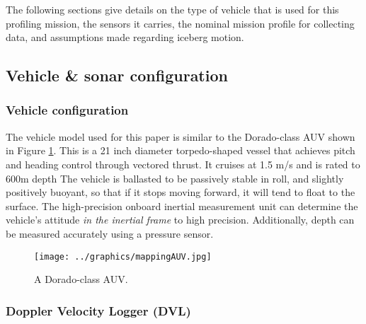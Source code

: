 The following sections give details on the type of vehicle that is used for this profiling mission, the sensors it carries, the nominal mission profile for collecting data, and assumptions made regarding iceberg motion. 

\subsection{Vehicle \& sonar configuration}
\label{sec.VehicleSetup}

\subsubsection{Vehicle configuration}
The vehicle model used for this paper is similar to the Dorado-class AUV shown in Figure \ref{fig:AUVdorado}. This is a 21 inch diameter torpedo-shaped vessel that achieves pitch and heading control through vectored thrust. It cruises at 1.5 m/s and is rated to 600m depth The vehicle is ballasted to be passively stable in roll, and slightly positively buoyant, so that if it stops moving forward, it will tend to float to the surface. The high-precision onboard inertial measurement unit can determine the vehicle's attitude \emph{in the inertial frame} to high precision. Additionally, depth can be measured accurately using a pressure sensor. 

\begin{figure}[htb]
   \centering
   \texttt{[image: ../graphics/mappingAUV.jpg]} %
   \caption{A Dorado-class AUV.}
   \label{fig:AUVdorado}
\end{figure}



\subsubsection{Doppler Velocity Logger (DVL)}

